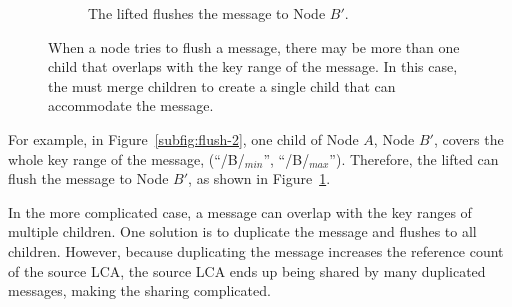 \begin{figure}
\begin{subfigure}{\textwidth}
        \caption{\label{subfig:flush-3} The lifted \bedag flushes the \goto message
            to Node $B'$.}
    \end{subfigure}
    \caption[The \bedag merges children before flushing a \goto message]{\label{fig:flush}
        When a node tries to flush a \goto message, there may be more than
        one child that overlaps with the key range of the \goto message.
        In this case, the \bedag must merge children to create a single child
        that can accommodate the \goto message.}
\end{figure}

For example, in Figure~\ref{subfig:flush-2}, one child of Node $A$, Node $B'$,
covers the whole key range of the \goto message,
(``/B/$_{min}$'', ``/B/$_{max}$'').
Therefore, the lifted \bedag can flush the \goto message to Node $B'$,
as shown in Figure~\ref{subfig:flush-3}.

In the more complicated case, a \goto message can overlap with the key ranges
of multiple children.
One solution is to duplicate the \goto message and flushes to all children.
However,
because duplicating the \goto message increases the reference count of the
source LCA,
the source LCA ends up being shared by many duplicated \goto messages,
making the sharing complicated.

